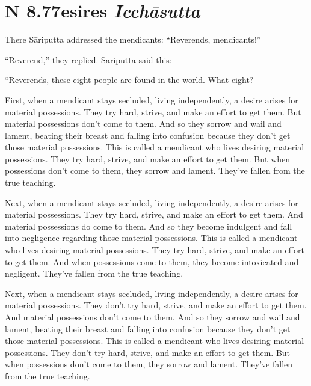 \documentclass[12pt,openany]{book}%
\newcommand*{\suttatitleacronym}[1]{\smaller[2]{#1}\vspace*{.3em}}
\newcommand*{\suttatitletranslation}[1]{\linebreak{#1}}
\newcommand*{\suttatitleroot}[1]{\linebreak\smaller[2]\itshape{#1}}
\newcommand*{\tocacronym}[1]{\hspace*{-3.3em}{#1}\quad}
\newcommand*{\toctranslation}[1]{#1}
\newcommand*{\tocroot}[1]{(\textit{#1})}
\begin{document}
%
\section*{{\suttatitleacronym AN 8.77}{\suttatitletranslation Desires }{\suttatitleroot Icchāsutta}}
\addcontentsline{toc}{section}{\tocacronym{AN 8.77} \toctranslation{Desires } \tocroot{Icchāsutta}}

There \textsanskrit{Sāriputta} addressed the mendicants: “Reverends, mendicants!” 

“Reverend,” they replied. \textsanskrit{Sāriputta} said this: 

“Reverends, these eight people are found in the world. What eight? 

First, when a mendicant stays secluded, living independently, a desire arises for material possessions. They try hard, strive, and make an effort to get them. But material possessions don’t come to them. And so they sorrow and wail and lament, beating their breast and falling into confusion because they don’t get those material possessions. This is called a mendicant who lives desiring material possessions. They try hard, strive, and make an effort to get them. But when possessions don’t come to them, they sorrow and lament. They’ve fallen from the true teaching. 

Next, when a mendicant stays secluded, living independently, a desire arises for material possessions. They try hard, strive, and make an effort to get them. And material possessions do come to them. And so they become indulgent and fall into negligence regarding those material possessions. This is called a mendicant who lives desiring material possessions. They try hard, strive, and make an effort to get them. And when possessions come to them, they become intoxicated and negligent. They’ve fallen from the true teaching. 

Next, when a mendicant stays secluded, living independently, a desire arises for material possessions. They don’t try hard, strive, and make an effort to get them. And material possessions don’t come to them. And so they sorrow and wail and lament, beating their breast and falling into confusion because they don’t get those material possessions. This is called a mendicant who lives desiring material possessions. They don’t try hard, strive, and make an effort to get them. But when possessions don’t come to them, they sorrow and lament. They’ve fallen from the true teaching. 
\end{document}
